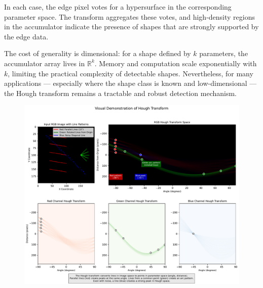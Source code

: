 In each case, the edge pixel votes for a hypersurface in the corresponding parameter space. The transform aggregates these votes, and high-density regions in the accumulator indicate the presence of shapes that are strongly supported by the edge data.

The cost of generality is dimensional: for a shape defined by $k$ parameters, the accumulator array lives in $\mathbb{R}^k$. Memory and computation scale exponentially with $k$, limiting the practical complexity of detectable shapes. Nevertheless, for many applications — especially where the shape class is known and low-dimensional — the Hough transform remains a tractable and robust detection mechanism.

\vspace{50em}

\begin{figure}[ht]
  \centering
  \includegraphics[width=1\textwidth]{41_HoughTransfrom/hough_transform_visualization.pdf}
  \label{fig:permgraph3}
\end{figure}
